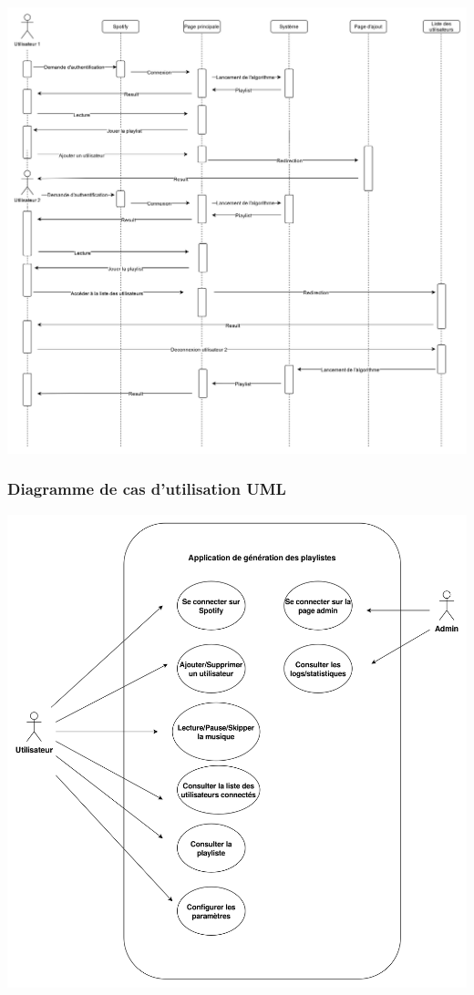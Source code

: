 \documentclass[12pt, openany]{report}
\begin{document}
  \includegraphics[scale=0.15]{images/scenar_user.png}
  
  \subsubsection{Diagramme de cas d'utilisation UML}
  
  \includegraphics[scale=0.17]{images/cas_dutilisation.png}
  
\end{document}
